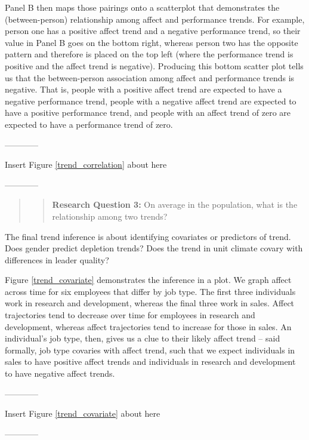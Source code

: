 \documentclass[english,,man]{apa6}
\begin{document}
Panel B then maps those pairings onto a scatterplot that demonstrates the (between-person) relationship among affect and performance trends. For example, person one has a positive affect trend and a negative performance trend, so their value in Panel B goes on the bottom right, whereas person two has the opposite pattern and therefore is placed on the top left (where the performance trend is positive and the affect trend is negative). Producing this bottom scatter plot tells us that the between-person association among affect and performance trends is negative. That is, people with a positive affect trend are expected to have a negative performance trend, people with a negative affect trend are expected to have a positive performance trend, and people with an affect trend of zero are expected to have a performance trend of zero.

\begin{center}

------------

Insert Figure \ref{trend_correlation} about here

------------

\end{center}

\begin{quote}
\begin{quote}
\textbf{Research Question 3:} On average in the population, what is the relationship among two trends?
\end{quote}
\end{quote}

The final trend inference is about identifying covariates or predictors of trend. Does gender predict depletion trends? Does the trend in unit climate covary with differences in leader quality?

Figure \ref{trend_covariate} demonstrates the inference in a plot. We graph affect across time for six employees that differ by job type. The first three individuals work in research and development, whereas the final three work in sales. Affect trajectories tend to decrease over time for employees in research and development, whereas affect trajectories tend to increase for those in sales. An individual's job type, then, gives us a clue to their likely affect trend -- said formally, job type covaries with affect trend, such that we expect individuals in sales to have positive affect trends and individuals in research and development to have negative affect trends.

\begin{center}

------------

Insert Figure \ref{trend_covariate} about here

------------

\end{center}
\end{document}
